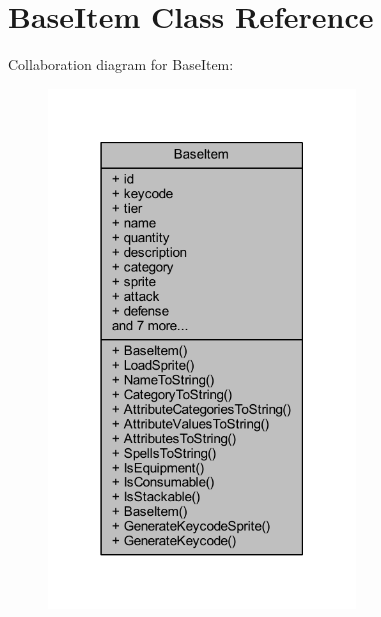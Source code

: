 \hypertarget{class_base_item}{}\section{Base\+Item Class Reference}
\label{class_base_item}


Collaboration diagram for Base\+Item\+:
\nopagebreak
\begin{figure}[H]
\begin{center}
\leavevmode
\includegraphics[width=231pt]{class_base_item__coll__graph}
\end{center}
\end{figure}
